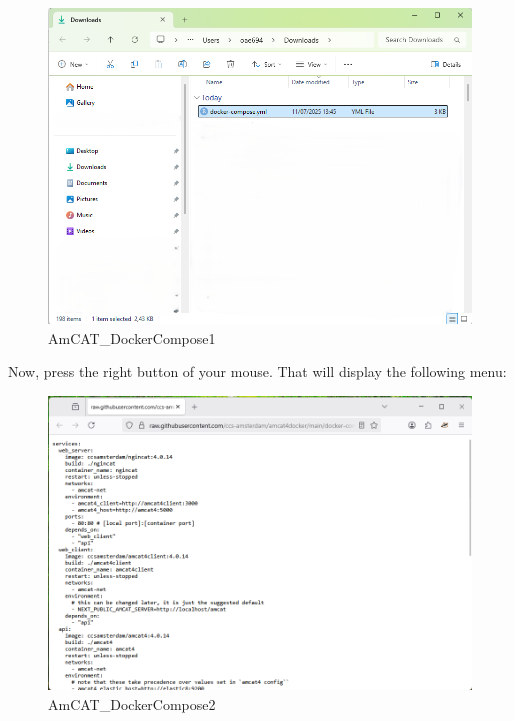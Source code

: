 \documentclass[
  letterpaper,
  DIV=11,
  numbers=noendperiod]{scrreprt}
\begin{document}
\begin{figure}[H]

{\centering \includegraphics[width=6.25in,height=\textheight]{media/amcat-2.1.2_2.png}

}

\caption{AmCAT\_DockerCompose1}

\end{figure}%

Now, press the right button of your mouse. That will display the
following menu:

\begin{figure}[H]

{\centering \includegraphics[width=6.25in,height=\textheight]{media/amcat-2.1.2_3.png}

}

\caption{AmCAT\_DockerCompose2}

\end{figure}%
\end{document}
